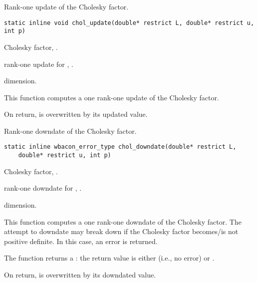 \documentclass[a4paper,oneside,10pt,DIV=12]{scrartcl}
\begin{document}
\begin{Description}
Rank-one update of the Cholesky factor.
\end{Description}
\begin{Usage}
\begin{verbatim}
static inline void chol_update(double* restrict L, double* restrict u, int p)
\end{verbatim}
\end{Usage}
\begin{Arguments}
	\begin{ldescription}
		\item[\code{L}] Cholesky factor, .
		\item[\code{u}] rank-one update for ,
			.
		\item[\code{p}] dimension.
	\end{ldescription}
\end{Arguments}
\begin{Details}
This function computes a one rank-one update of the Cholesky factor.
\end{Details}
\begin{Value}
On return,  is overwritten by its updated value.
\end{Value}

\begin{Description}
Rank-one downdate of the Cholesky factor.
\end{Description}
\begin{Usage}
\begin{verbatim}
static inline wbacon_error_type chol_downdate(double* restrict L,
    double* restrict u, int p)
\end{verbatim}
\end{Usage}
\begin{Arguments}
	\begin{ldescription}
		\item[\code{L}] Cholesky factor, \code{double array[p, p]}.
		\item[\code{u}] rank-one downdate for \code{L},
			\code{double array[p]}.
		\item[\code{p}] dimension.
	\end{ldescription}
\end{Arguments}
\begin{Details}
This function computes a one rank-one downdate of the Cholesky factor. The
attempt to downdate may break down if the Cholesky factor becomes/is not
positive definite. In this case, an error is returned.
\end{Details}
\begin{Value}
The function returns a :
the return value is either  (i.e., no error) or
.

On return,  is overwritten by its downdated value.
\end{Value}
\end{document}
